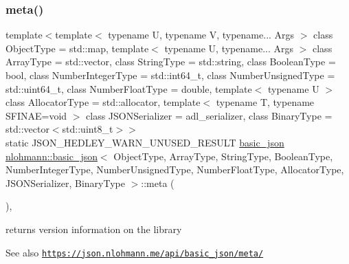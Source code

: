 \subsubsection{\texorpdfstring{meta()}{meta()}}
{\footnotesize\ttfamily template$<$template$<$ typename U, typename V, typename... Args $>$ class Object\+Type = std\+::map, template$<$ typename U, typename... Args $>$ class Array\+Type = std\+::vector, class String\+Type  = std\+::string, class Boolean\+Type  = bool, class Number\+Integer\+Type  = std\+::int64\+\_\+t, class Number\+Unsigned\+Type  = std\+::uint64\+\_\+t, class Number\+Float\+Type  = double, template$<$ typename U $>$ class Allocator\+Type = std\+::allocator, template$<$ typename T, typename S\+F\+I\+N\+A\+E=void $>$ class J\+S\+O\+N\+Serializer = adl\+\_\+serializer, class Binary\+Type  = std\+::vector$<$std\+::uint8\+\_\+t$>$$>$ \\
static J\+S\+O\+N\+\_\+\+H\+E\+D\+L\+E\+Y\+\_\+\+W\+A\+R\+N\+\_\+\+U\+N\+U\+S\+E\+D\+\_\+\+R\+E\+S\+U\+LT \hyperlink{classnlohmann_1_1basic__json}{basic\+\_\+json} \hyperlink{classnlohmann_1_1basic__json}{nlohmann\+::basic\+\_\+json}$<$ Object\+Type, Array\+Type, String\+Type, Boolean\+Type, Number\+Integer\+Type, Number\+Unsigned\+Type, Number\+Float\+Type, Allocator\+Type, J\+S\+O\+N\+Serializer, Binary\+Type $>$\+::meta (\begin{DoxyParamCaption}{ }\end{DoxyParamCaption})\hspace{0.3cm}{\ttfamily [inline]}, {\ttfamily [static]}}



returns version information on the library 

\begin{DoxySeeAlso}{See also}
\href{https://json.nlohmann.me/api/basic_json/meta/}{\tt https\+://json.\+nlohmann.\+me/api/basic\+\_\+json/meta/} 
\end{DoxySeeAlso}
\mbox{\label{classnlohmann_1_1basic__json_a9a4df356e05415438fadf8a15e583903}} 
